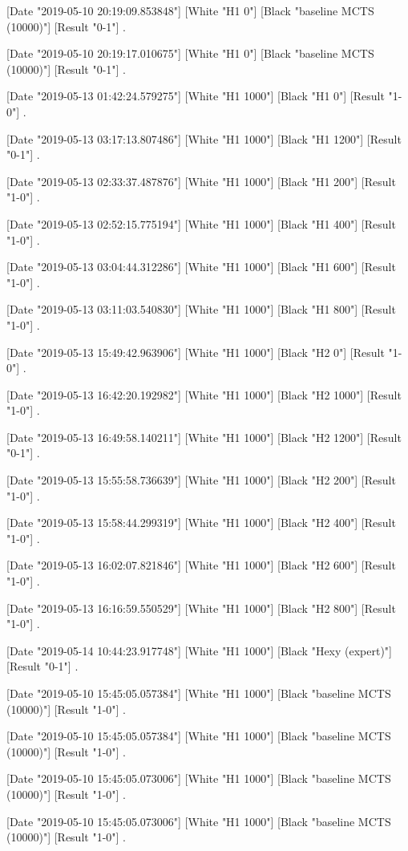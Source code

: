 {[Date "2019-05-10 20:19:09.853848"]
[White "H1 0"]
[Black "baseline MCTS (10000)"]
[Result "0-1"]
.

[Date "2019-05-10 20:19:17.010675"]
[White "H1 0"]
[Black "baseline MCTS (10000)"]
[Result "0-1"]
.

[Date "2019-05-13 01:42:24.579275"]
[White "H1 1000"]
[Black "H1 0"]
[Result "1-0"]
.

[Date "2019-05-13 03:17:13.807486"]
[White "H1 1000"]
[Black "H1 1200"]
[Result "0-1"]
.

[Date "2019-05-13 02:33:37.487876"]
[White "H1 1000"]
[Black "H1 200"]
[Result "1-0"]
.

[Date "2019-05-13 02:52:15.775194"]
[White "H1 1000"]
[Black "H1 400"]
[Result "1-0"]
.

[Date "2019-05-13 03:04:44.312286"]
[White "H1 1000"]
[Black "H1 600"]
[Result "1-0"]
.

[Date "2019-05-13 03:11:03.540830"]
[White "H1 1000"]
[Black "H1 800"]
[Result "1-0"]
.

[Date "2019-05-13 15:49:42.963906"]
[White "H1 1000"]
[Black "H2 0"]
[Result "1-0"]
.

[Date "2019-05-13 16:42:20.192982"]
[White "H1 1000"]
[Black "H2 1000"]
[Result "1-0"]
.

[Date "2019-05-13 16:49:58.140211"]
[White "H1 1000"]
[Black "H2 1200"]
[Result "0-1"]
.

[Date "2019-05-13 15:55:58.736639"]
[White "H1 1000"]
[Black "H2 200"]
[Result "1-0"]
.

[Date "2019-05-13 15:58:44.299319"]
[White "H1 1000"]
[Black "H2 400"]
[Result "1-0"]
.

[Date "2019-05-13 16:02:07.821846"]
[White "H1 1000"]
[Black "H2 600"]
[Result "1-0"]
.

[Date "2019-05-13 16:16:59.550529"]
[White "H1 1000"]
[Black "H2 800"]
[Result "1-0"]
.

[Date "2019-05-14 10:44:23.917748"]
[White "H1 1000"]
[Black "Hexy (expert)"]
[Result "0-1"]
.

[Date "2019-05-10 15:45:05.057384"]
[White "H1 1000"]
[Black "baseline MCTS (10000)"]
[Result "1-0"]
.

[Date "2019-05-10 15:45:05.057384"]
[White "H1 1000"]
[Black "baseline MCTS (10000)"]
[Result "1-0"]
.

[Date "2019-05-10 15:45:05.073006"]
[White "H1 1000"]
[Black "baseline MCTS (10000)"]
[Result "1-0"]
.

[Date "2019-05-10 15:45:05.073006"]
[White "H1 1000"]
[Black "baseline MCTS (10000)"]
[Result "1-0"]
.

}
